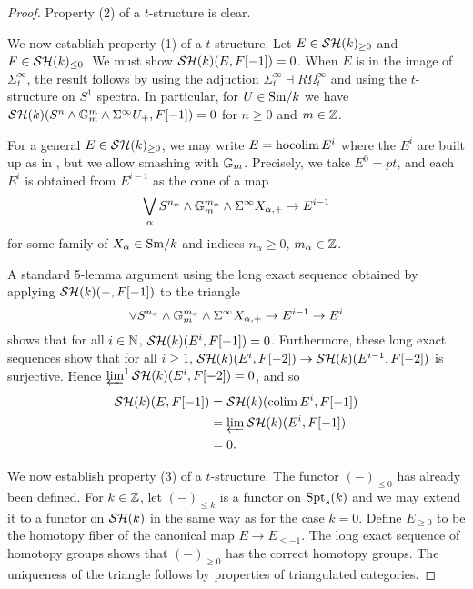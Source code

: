 \documentclass{amsart}%
\begin{document}
\begin{proof}
  Property (2) of a $t$-structure is clear.
  
  We now establish property (1) of a $t$-structure. Let
  $E \in \mathcal{SH}(k)_{\geq 0}$ and $F \in \mathcal{SH}(k)_{\leq 0}$. We must show
  $\mathcal{SH}(k)(E,F[-1])=0$.  When $E$ is in the image of
  $\Sigma^{\infty}_t$, the result follows by using the adjuction
  $\Sigma^{\infty}_t \dashv R\Omega^{\infty}_t$ and using the
  $t$-structure on $S^1$ spectra. In particular, for $U \in \mathrm{Sm}/k$ we
  have
  $\mathcal{SH}(k)(S^n \wedge \mathbb{G}_m^m \wedge \Sigma^{\infty} U_+, F[-1])=0$
  for $n\geq 0$ and $m \in \mathbb{Z}$.

  For a general $E \in \mathcal{SH}(k)_{\geq 0}$, we may write
  $E = \operatorname{hocolim} E^i$ where the $E^i$ are built up as in
  \cite[3.3.4]{Mor05}, but we allow smashing with $\mathbb{G}_m$.
  Precisely, we take $E^0 = pt$, and each $E^i$ is obtained from
  $E^{i-1}$ as the cone of a map
  \begin{equation*}
    \bigvee_{\alpha}S^{n_{\alpha} }\wedge \mathbb{G}_m^{m_{\alpha}} \wedge \Sigma^{\infty} X_{\alpha, +} 
    \to E^{i-1}
  \end{equation*}
  for some family of $X_{\alpha} \in \mathrm{Sm}/k$ and indices
  $n_{\alpha}\geq 0$, $m_{\alpha}\in \mathbb{Z}$. 

  A standard 5-lemma argument using the long exact sequence obtained
  by applying $\mathcal{SH}(k)(-, F[-1])$ to the triangle
  \begin{equation*}
    \vee S^{n_{\alpha} }\wedge \mathbb{G}_m^{m_{\alpha}} \wedge \Sigma^{\infty} X_{\alpha, +} \to E^{i-1} \to E^i
  \end{equation*}
  shows that for all $i\in \mathbb{N}$, $\mathcal{SH}(k)(E^i,F[-1])=0$. Furthermore,
  these long exact sequences show that for all $i\geq 1$,
  $\mathcal{SH}(k)(E^{i},F[-2]) \to \mathcal{SH}(k)(E^{i-1}, F[-2])$ is
  surjective. Hence $\operatorname{\underleftarrow{\lim}}^{1} \mathcal{SH}(k)(E^{i}, F[-2]) = 0$, and
  so
  \begin{align*}
    \mathcal{SH}(k)(E, F[-1]) & = \mathcal{SH}(k)(\operatorname{colim} E^i, F[-1]) \\
                     & = \operatorname{\underleftarrow{\lim}} \mathcal{SH}(k)(E^i, F[-1]) \\
                     & = 0.
  \end{align*}

  We now establish property (3) of a $t$-structure.  The functor
  $(-)_{\leq 0}$ has already been defined. For $k\in\mathbb{Z}$, let
  $(-)_{\leq k}$ is a functor on $\mathrm{Spt}_s(k)$ and we may extend it to a
  functor on $\mathcal{SH}(k)$ in the same way as for the case $k=0$. Define
  $E_{\geq 0}$ to be the homotopy fiber of the canonical map
  $E \to E_{\leq -1}$. The long exact sequence of homotopy groups
  shows that $(-)_{\geq 0}$ has the correct homotopy groups. The
  uniqueness of the triangle follows by properties of triangulated
  categories.
\end{proof}
\end{document}
